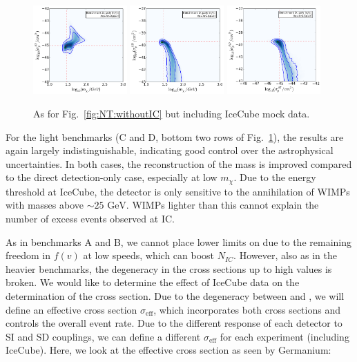 \begin{figure}[p!]
  \includegraphics[trim=0.2cm 0.2cm 0.2cm 0.2cm, clip,width=0.32\textwidth]{NT/BenchmarkD_poly-mx_sigsi.pdf}
  \includegraphics[trim=0.2cm 0.2cm 0.2cm 0.2cm, clip,width=0.32\textwidth]{NT/BenchmarkD_poly-mx_sigsd.pdf}
  \includegraphics[trim=0.2cm 0.2cm 0.2cm 0.2cm, clip,width=0.32\textwidth]{NT/BenchmarkD_poly-sigsi_sigsd.pdf}
\caption[As for Fig.~\ref{fig:NT:withoutIC} but including IceCube mock data]{As for Fig.~\ref{fig:NT:withoutIC} but including IceCube mock data. }
\label{fig:NT:withIC}
\end{figure}

For the light benchmarks (C and D, bottom two rows of Fig.~\ref{fig:NT:withIC}), the results are again largely indistinguishable, indicating good control over the astrophysical uncertainties. In both cases, the reconstruction of the mass is improved compared to the direct detection-only case, especially at low $m_\chi$. Due to the energy threshold at IceCube, the detector is only sensitive to the annihilation of WIMPs with masses above $\sim 25 \textrm{ GeV}$. WIMPs lighter than this cannot explain the number of excess events observed at IC. 

As in benchmarks A and B, we cannot place lower limits on \sigmapsd due to the remaining freedom in $f(v)$ at low speeds, which can boost $N_{IC}$. However, also as in the heavier benchmarks, the degeneracy in the cross sections up to high values is broken. We would like to determine the effect of IceCube data on the determination of the cross section. Due to the degeneracy between \sigmapsi and \sigmapsd, we will define an effective cross section $\sigma_\textrm{eff}$, which incorporates both cross sections and controls the overall event rate. Due to the different response of each detector to SI and SD couplings, we can define a different $\sigma_\textrm{eff}$ for each experiment (including IceCube). Here, we look at the effective cross section as seen by Germanium:

